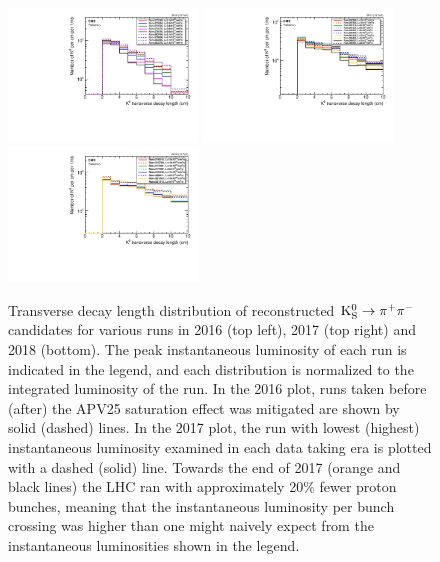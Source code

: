 \begin{figure}
\centering
\includegraphics[width=0.45\textwidth]{figures/tracking_eff/2016/k0.pdf}
\includegraphics[width=0.45\textwidth]{figures/tracking_eff/2017/k0.pdf}
\includegraphics[width=0.45\textwidth]{figures/tracking_eff/2018/k0.pdf}
\caption{Transverse decay length distribution of reconstructed $\mathrm{K^0_S}\to\pi^+\pi^-$ candidates for various runs in 2016 (top left), 2017 (top right) and 2018 (bottom). The peak instantaneous luminosity of each run is indicated in the legend, and each distribution is normalized to the integrated luminosity of the run. In the 2016 plot, runs taken before (after) the APV25 saturation effect was mitigated are shown by solid (dashed) lines. In the 2017 plot, the run with lowest (highest) instantaneous luminosity examined in each data taking era is plotted with a dashed (solid) line. Towards the end of 2017 (orange and black lines) the LHC ran with approximately 20\% fewer proton bunches, meaning that the instantaneous luminosity per bunch crossing was higher than one might naively expect from the instantaneous luminosities shown in the legend.}
\label{k0_tracking_eff}
\end{figure}